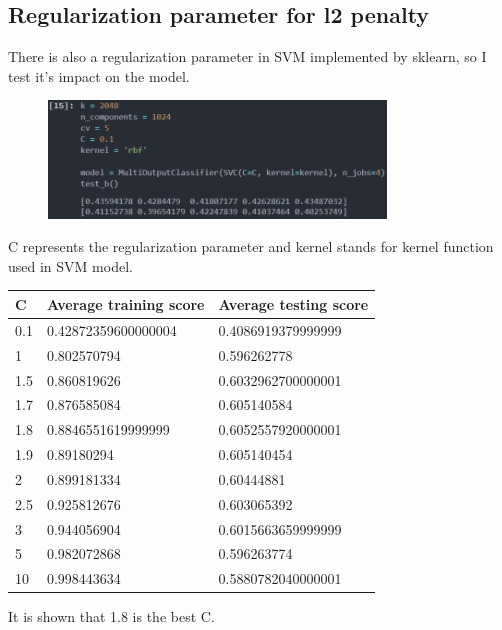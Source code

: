 \documentclass[UTF8, a4paper, 11pt]{article}
\begin{document}
\subsection{Regularization parameter for l2 penalty}
There is also a regularization parameter in SVM implemented by sklearn, so I test it's impact on the model.
\begin{figure}[H]
    \centering
    \includegraphics[width=0.8\textwidth]{C.png}
\end{figure}
C represents the regularization parameter and kernel stands for kernel function used in SVM model.
\begin{table}[H]
    \center
\begin{tabular}{|l|l|l|}
\hline
C   & Average training score & Average testing score \\ \hline
0.1 & 0.42872359600000004    & 0.4086919379999999    \\ \hline
1   & 0.802570794            & 0.596262778           \\ \hline
1.5 & 0.860819626            & 0.6032962700000001    \\ \hline
1.7 & 0.876585084            & 0.605140584           \\ \hline
1.8 & 0.8846551619999999     & 0.6052557920000001    \\ \hline
1.9 & 0.89180294             & 0.605140454           \\ \hline
2   & 0.899181334            & 0.60444881            \\ \hline
2.5 & 0.925812676            & 0.603065392           \\ \hline
3   & 0.944056904            & 0.6015663659999999    \\ \hline
5   & 0.982072868            & 0.596263774           \\ \hline
10  & 0.998443634            & 0.5880782040000001    \\ \hline
\end{tabular}
\end{table}
It is shown that 1.8 is the best C.
\end{document}
